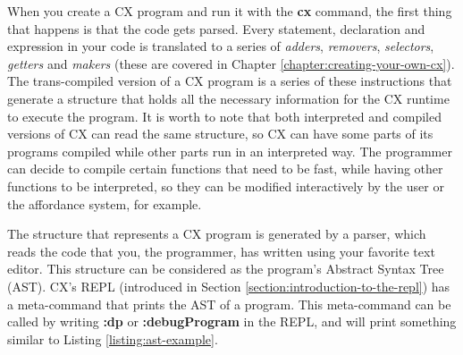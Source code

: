 \documentclass[11pt,fleqn,openany]{book} %
\begin{document}

When you create a CX program and run it with the \textbf{cx} command, the first thing that happens is that the code gets parsed. Every statement, declaration and expression in your code is translated to a series of \textit{adders}, \textit{removers}, \textit{selectors}, \textit{getters} and \textit{makers} (these are covered in Chapter \ref{chapter:creating-your-own-cx}). The trans-compiled version of a CX program is a series of these instructions that generate a structure that holds all the necessary information for the CX runtime to execute the program. It is worth to note that both interpreted and compiled versions of CX can read the same structure, so CX can have some parts of its programs compiled while other parts run in an interpreted way. The programmer can decide to compile certain functions that need to be fast, while having other functions to be interpreted, so they can be modified interactively by the user or the affordance system, for example.

The structure that represents a CX program is generated by a parser, which reads the code that you, the programmer, has written using your favorite text editor. This structure can be considered as the program's Abstract Syntax Tree (AST). CX's REPL (introduced in Section \ref{section:introduction-to-the-repl}) has a meta-command that prints the AST of a program. This meta-command can be called by writing \textbf{:dp} or \textbf{:debugProgram} in the REPL, and will print something similar to Listing \ref{listing:ast-example}.
\end{document}
